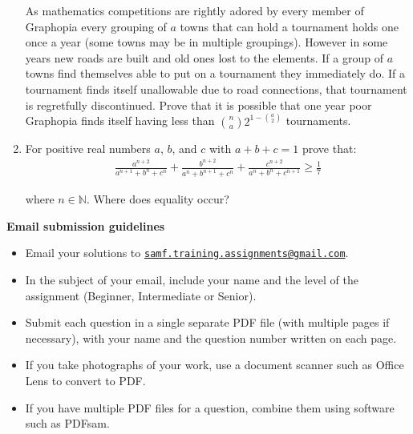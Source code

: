 \documentclass{article}
\begin{document}
\begin{enumerate}
As mathematics competitions are rightly adored by every member of Graphopia every grouping of $a$ towns that can hold a tournament holds one once a year (some towns may be in multiple groupings). However in some years new roads are built and old ones lost to the elements. If a group of $a$ towns find themselves able to put on a tournament they immediately do. If a tournament finds itself unallowable due to road connections, that tournament is regretfully discontinued. Prove that it is possible that one year poor Graphopia finds itself having less than $\binom{n}{a} $$2^{1-\binom{a}{2}}$ tournaments.


\medskip
\item %
For positive real numbers $a$, $b$, and $c$ with $a+b+c=1$ prove that:
\begin{align*}
 	\frac{a^{n+2}}{a^{n+1} + b^n + c^n} + \frac{b^{n+2}}{a^n + b^{n+1} + c^n} + \frac{c^{n+2}}{a^n + b^n + c^{n+1}} \ge \frac{1}{7}
\end{align*}

where $n \in \mathbb{N}$. Where does equality occur?

\end{enumerate}


\vfill
\textbf{\Large Email submission guidelines}
\begin{itemize}
	\item Email your solutions to \href{mailto:samf.training.assignments@gmail.com}{\texttt{samf.training.assignments@gmail.com}}.
	\item In the subject of your email, include your name and the level of the assignment (Beginner, Intermediate or Senior).
	\item Submit each question in a single separate PDF file (with multiple pages if necessary), with your name and the question number written on each page.
	\item If you take photographs of your work, use a document scanner such as Office Lens to convert to PDF.
	\item If you have multiple PDF files for a question, combine them using software such as PDFsam.
\end{itemize}
\end{document}
